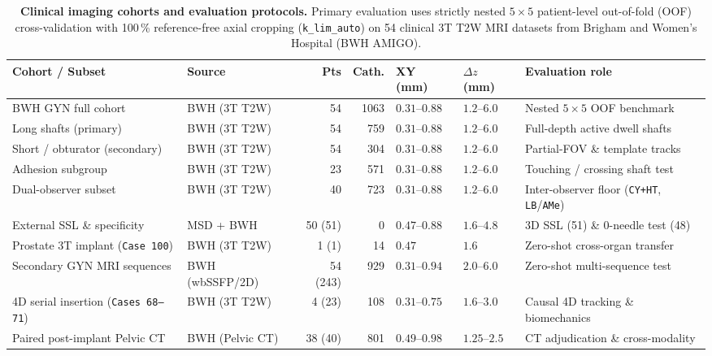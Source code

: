 \begin{table}[tbp]
\centering
\begin{threeparttable}
\caption{\textbf{Clinical imaging cohorts and evaluation protocols.}
Primary evaluation uses strictly nested $5\times 5$ patient-level out-of-fold (OOF) cross-validation with 100\,\% reference-free axial cropping (\texttt{k\_lim\_auto}) on 54 clinical 3T T2W MRI datasets from Brigham and Women's Hospital (BWH AMIGO).}
\label{tbl:cohorts}
\footnotesize
\setlength{\tabcolsep}{1.8pt}
\begin{tabular}{@{}L L R R L L L@{}}
\toprule
Cohort / Subset & Source & {Pts} & {Cath.} & {XY (mm)} & {$\Delta z$ (mm)} & {Evaluation role}\\
\midrule
BWH GYN full cohort & BWH (3T T2W) & 54 & 1063 & $0.31\text{--}0.88$ & $1.2\text{--}6.0$ & Nested $5\times 5$ OOF benchmark\\
\quad Long shafts (primary) & BWH (3T T2W) & 54 & 759 & $0.31\text{--}0.88$ & $1.2\text{--}6.0$ & Full-depth active dwell shafts\\
\quad Short / obturator (secondary) & BWH (3T T2W) & 54 & 304 & $0.31\text{--}0.88$ & $1.2\text{--}6.0$ & Partial-FOV \& template tracks\\
\quad Adhesion subgroup & BWH (3T T2W) & 23 & 571 & $0.31\text{--}0.88$ & $1.2\text{--}6.0$ & Touching / crossing shaft test\\
Dual-observer subset & BWH (3T T2W) & 40 & 723 & $0.31\text{--}0.88$ & $1.2\text{--}6.0$ & Inter-observer floor (\texttt{CY+HT}, \texttt{LB}/\texttt{AMe})\\
External SSL \& specificity & MSD + BWH & 50 (51) & 0 & $0.47\text{--}0.88$ & $1.6\text{--}4.8$ & 3D SSL (51) \& 0-needle test (48)\\
Prostate 3T implant (\texttt{Case 100}) & BWH (3T T2W) & 1 (1) & 14 & $0.47$ & $1.6$ & Zero-shot cross-organ transfer\\
Secondary GYN MRI sequences & BWH (wbSSFP/2D) & 54 (243) & 929 & $0.31\text{--}0.94$ & $2.0\text{--}6.0$ & Zero-shot multi-sequence test\\
4D serial insertion (\texttt{Cases 68--71}) & BWH (3T T2W) & 4 (23) & 108 & $0.31\text{--}0.75$ & $1.6\text{--}3.0$ & Causal 4D tracking \& biomechanics\\
Paired post-implant Pelvic CT & BWH (Pelvic CT) & 38 (40) & 801 & $0.49\text{--}0.98$ & $1.25\text{--}2.5$ & CT adjudication \& cross-modality\\
\bottomrule

\end{tabular}
\end{threeparttable}
\end{table}
